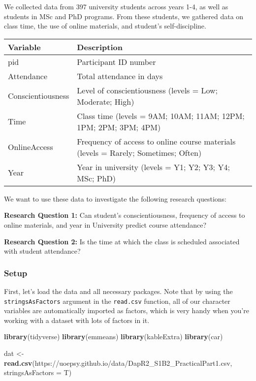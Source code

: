 \documentclass[
]{article}
\newenvironment{Shaded}{\begin{snugshade}}{\end{snugshade}}
\newcommand{\AttributeTok}[1]{\textcolor[rgb]{0.13,0.29,0.53}{#1}}
\newcommand{\FunctionTok}[1]{\textcolor[rgb]{0.13,0.29,0.53}{\textbf{#1}}}
\newcommand{\NormalTok}[1]{#1}
\newcommand{\OtherTok}[1]{\textcolor[rgb]{0.56,0.35,0.01}{#1}}
\newcommand{\StringTok}[1]{\textcolor[rgb]{0.31,0.60,0.02}{#1}}
\begin{document}
We collected data from 397 university students across years 1-4, as well as students in MSc and PhD programs. From these students, we gathered data on class time, the use of online materials, and student's self-discipline.

\begin{longtable}{ll}
\toprule
Variable & Description \\ 
\midrule
pid & Participant ID number \\ 
Attendance & Total attendance in days \\ 
Conscientiousness & Level of conscientiousness (levels = Low; Moderate; High) \\ 
Time & Class time (levels = 9AM; 10AM; 11AM; 12PM; 1PM; 2PM; 3PM; 4PM) \\ 
OnlineAccess & Frequency of access to online course materials (levels = Rarely; Sometimes; Often) \\ 
Year & Year in university (levels = Y1; Y2; Y3; Y4; MSc; PhD) \\ 
\bottomrule
\end{longtable}

We want to use these data to investigate the following research questions:

\textbf{Research Question 1:} Can student's conscientiousness, frequency of access to online materials, and year in University predict course attendance?

\textbf{Research Question 2:} Is the time at which the class is scheduled associated with student attendance?

\hypertarget{setup}{%
\subsubsection{Setup}\label{setup}}

First, let's load the data and all necessary packages. Note that by using the \texttt{stringsAsFactors} argument in the \texttt{read.csv} function, all of our character variables are automatically imported as factors, which is very handy when you're working with a dataset with lots of factors in it.

\begin{Shaded}
\begin{Highlighting}[]
\FunctionTok{library}\NormalTok{(tidyverse)}
\FunctionTok{library}\NormalTok{(emmeans)}
\FunctionTok{library}\NormalTok{(kableExtra)}
\FunctionTok{library}\NormalTok{(car)}

\NormalTok{dat }\OtherTok{\textless{}{-}} \FunctionTok{read.csv}\NormalTok{(}\StringTok{\textquotesingle{}https://uoepsy.github.io/data/DapR2\_S1B2\_PracticalPart1.csv\textquotesingle{}}\NormalTok{, }\AttributeTok{stringsAsFactors =}\NormalTok{ T)}
\end{Highlighting}
\end{Shaded}
\end{document}
